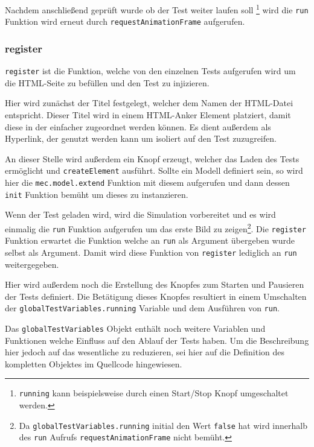 Nachdem anschließend geprüft wurde ob der Test weiter laufen soll \footnote{\lstinline{running} kann beispielsweise durch einen Start/Stop Knopf umgeschaltet werden.} wird die \lstinline{run} Funktion wird erneut durch \lstinline{requestAnimationFrame} aufgerufen.

\subsubsection{register}\label{ch:gtv_register}

\lstinline{register} ist die Funktion, welche von den einzelnen Tests aufgerufen wird um die HTML-Seite zu befüllen und den Test zu injizieren.

Hier wird zunächst der Titel festgelegt, welcher dem Namen der HTML-Datei entspricht.
Dieser Titel wird in einem HTML-Anker Element %
platziert, damit diese in der  einfacher zugeordnet werden können.
Es dient außerdem als Hyperlink, der genutzt werden kann um isoliert auf den Test zuzugreifen.

An dieser Stelle wird außerdem ein Knopf erzeugt, welcher das Laden des Tests ermöglicht und \lstinline{createElement} ausführt.
Sollte ein  Modell definiert sein, so wird hier die \lstinline{mec.model.extend} Funktion mit diesem aufgerufen und dann dessen \lstinline{init} Funktion bemüht um dieses zu instanzieren. %

Wenn der Test geladen wird, wird die Simulation vorbereitet und es wird einmalig die \lstinline{run} Funktion aufgerufen um das erste Bild zu zeigen\footnote{Da \lstinline{globalTestVariables.running} initial den Wert \lstinline{false} hat wird innerhalb des \lstinline{run} Aufrufs \lstinline{requestAnimationFrame} nicht bemüht.}.
Die \lstinline{register} Funktion erwartet die Funktion welche an \lstinline{run} als Argument übergeben wurde selbst als Argument.
Damit wird diese Funktion von \lstinline{register} lediglich an \lstinline{run} weitergegeben.

Hier wird außerdem noch die Erstellung des Knopfes zum Starten und Pausieren der Tests definiert.
Die Betätigung dieses Knopfes resultiert in einem Umschalten der \lstinline{globalTestVariables.running} Variable und dem Ausführen von \lstinline{run}.

Das \lstinline{globalTestVariables} Objekt enthält noch weitere Variablen und Funktionen welche Einfluss auf den Ablauf der Tests haben.
Um die Beschreibung hier jedoch auf das wesentliche zu reduzieren, sei hier auf die Definition des kompletten Objektes im Quellcode %
hingewiesen.

